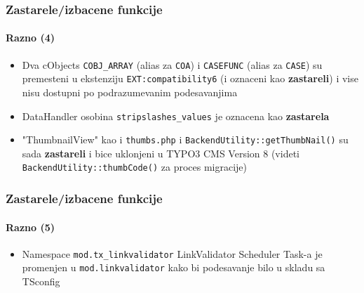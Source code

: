 \begin{frame}[fragile]
	\frametitle{Zastarele/izbacene funkcije}
	\framesubtitle{Razno (4)}

	\lstset{basicstyle=\tiny\ttfamily}

	\begin{itemize}

		\item Dva cObjects
			\small\texttt{COBJ\_ARRAY}\normalsize\space
			(alias za \texttt{COA})
			i
			\small\texttt{CASEFUNC}\normalsize\space
			(alias za \texttt{CASE})
			su premesteni u ekstenziju \texttt{EXT:compatibility6}
			(i oznaceni kao \textbf{zastareli}) i vise nisu dostupni po podrazumevanim podesavanjima

		\item DataHandler osobina
			\small\texttt{stripslashes\_values}\normalsize\space
			je oznacena kao \textbf{zastarela}

		\item "ThumbnailView" kao i \texttt{thumbs.php} i \texttt{BackendUtility::getThumbNail()}
			su sada \textbf{zastareli} i bice uklonjeni u TYPO3 CMS Version 8\newline
			(videti \texttt{BackendUtility::thumbCode()} za proces migracije)

	\end{itemize}

\end{frame}


\begin{frame}[fragile]
	\frametitle{Zastarele/izbacene funkcije}
	\framesubtitle{Razno (5)}

	\lstset{basicstyle=\tiny\ttfamily}

	\begin{itemize}

		\item Namespace \texttt{mod.tx\_linkvalidator} LinkValidator
			Scheduler Task-a je promenjen u \texttt{mod.linkvalidator} kako bi podesavanje bilo u skladu sa TSconfig

	\end{itemize}

\end{frame}

